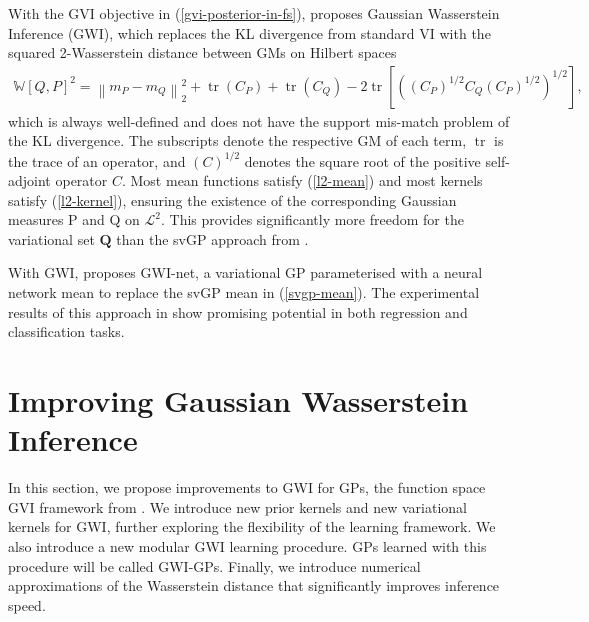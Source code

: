 \documentclass{article}
\newcommand{\tr}{\operatorname{tr}}
\numberwithin{equation}{section}
\begin{document}
With the GVI objective in (\ref{gvi-posterior-in-fs}), \cite{wild2022generalized} proposes Gaussian Wasserstein Inference (GWI), which replaces the KL divergence from standard VI with the squared 2-Wasserstein distance between GMs on Hilbert spaces 
\begin{align}
    \mathbb{W}\left[Q, P\right]^2 = \left\|m_P - m_Q\right\|_2^2 + \tr\left(C_P\right) + \tr\left(C_Q\right) - 2 \tr \left[\left(\left(C_P\right)^{1/2} C_Q \left(C_P\right)^{1/2} \right)^{1/2}\right],
    \label{wasserstein-distance}
\end{align}
which is always well-defined and does not have the support mis-match problem of the KL divergence.
The subscripts denote the respective GM of each term, $\tr$ is the trace of an operator, and $(C)^{1/2}$ denotes the square root of the positive self-adjoint operator $C$.
Most mean functions satisfy (\ref{l2-mean}) and most kernels satisfy (\ref{l2-kernel}), ensuring the existence of the corresponding Gaussian measures P and Q on $\mathcal{L}^2$.
This provides significantly more freedom for the variational set $\boldsymbol{Q}$ than the svGP approach from \cite{titsias2009variational}.

With GWI, \cite{wild2022generalized} proposes GWI-net, a variational GP parameterised with a neural network mean to replace the svGP mean in (\ref{svgp-mean}).
The experimental results of this approach in \cite{wild2022generalized} show promising potential in both regression and classification tasks.

\newpage

\section{Improving Gaussian Wasserstein Inference}\label{section:improving-gwi}
In this section, we propose improvements to GWI for GPs, the function space GVI framework from \cite{wild2022generalized}.
We introduce new prior kernels and new variational kernels for GWI, further exploring the flexibility of the learning framework.
We also introduce a new modular GWI learning procedure.
GPs learned with this procedure will be called GWI-GPs.
Finally, we introduce numerical approximations of the Wasserstein distance that significantly improves inference speed.
\end{document}
